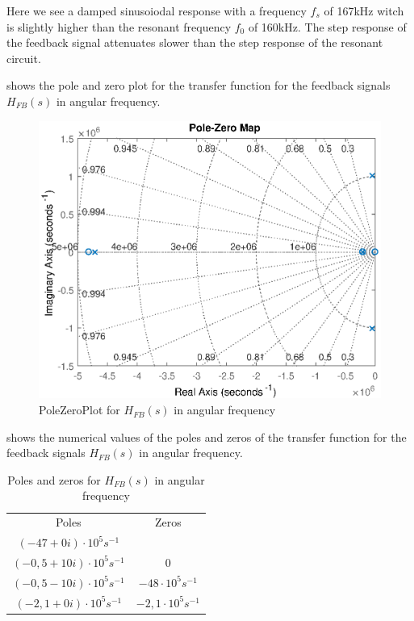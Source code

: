 Here we see a damped sinusoiodal response with a frequency $f_s$ of 167kHz witch is slightly higher than the resonant frequency $f_0$ of 160kHz. The step response of the feedback signal attenuates slower than the step response of the resonant circuit.

 shows the pole and zero plot for the transfer function for the feedback signals $H_{FB}(s)$ in angular frequency.

\begin{figure}[H]
    \centering
    \includegraphics[width=\textwidth]{img/FeedBackPoleZeroPlot.eps}
    \caption{PoleZeroPlot for $H_{FB}(s)$ in angular frequency}
    \label{fig:fbpolezero}
\end{figure}

 shows the numerical values of the poles and zeros of the transfer function for the feedback signals $H_{FB}(s)$ in angular frequency.

\begin{table}[H]
    \centering
    \begin{tabular}{c|c}
        Poles & Zeros \\
        $(-47 + 0i)\cdot 10^{5} s^{-1}$ & \\
        $(-0,5 + 10i)\cdot 10^{5} s^{-1}$ & $0$ \\
        $(-0,5 - 10i)\cdot 10^{5} s^{-1}$ & $-48\cdot 10^{5} s^{-1}$ \\
        $(-2,1 + 0i)\cdot 10^{5} s^{-1}$ & $-2,1\cdot 10^{5} s^{-1}$ \\
    \end{tabular}
    \caption{Poles and zeros for $H_{FB}(s)$ in angular frequency}
    \label{tab:fbcoilrigpoles}
\end{table}

